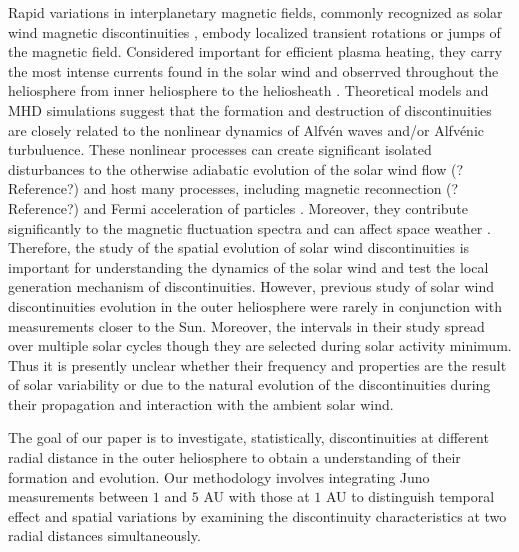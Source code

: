 \documentclass[
]{agujournal2019}
\begin{document}
Rapid variations in interplanetary magnetic fields, commonly recognized as solar wind magnetic discontinuities \citep{colburnDiscontinuitiesSolarWind1966}, embody localized transient rotations or jumps of the magnetic field. Considered important for efficient plasma heating, they carry the most intense currents found in the solar wind and obserrved throughout the heliosphere from inner heliosphere \citep{liuCategorizingMHDDiscontinuities2022} to the heliosheath \citep{burlagaCurrentSheetsHeliosheath2011}. Theoretical models \citep{lerchePropagationMagneticDisturbances1975, medvedevDissipativeDynamicsCollisionless1997} and MHD simulations \citep{grecoIntermittentMHDStructures2008, grecoStatisticalAnalysisDiscontinuities2009, yangFormationRotationalDiscontinuities2015} suggest that the formation and destruction of discontinuities are closely related to the nonlinear dynamics of Alfvén waves and/or Alfvénic turbuluence. These nonlinear processes can create significant isolated disturbances to the otherwise adiabatic evolution of the solar wind flow (?Reference?) and host many processes, including magnetic reconnection (?Reference?) and Fermi acceleration of particles \citep{wentzelMotionMagneticDiscontinuities1964}. Moreover, they contribute significantly to the magnetic fluctuation spectra \citep{borovskyContributionStrongDiscontinuities2010} and can affect space weather \citep{tsurutaniReviewInterplanetaryDiscontinuities2011}. Therefore, the study of the spatial evolution of solar wind discontinuities is important for understanding the dynamics of the solar wind and test the local generation mechanism of discontinuities. However, previous study of solar wind discontinuities evolution \citep{sodingRadialLatitudinalDependencies2001} in the outer heliosphere were rarely in conjunction with measurements closer to the Sun. Moreover, the intervals in their study spread over multiple solar cycles though they are selected during solar activity minimum. Thus it is presently unclear whether their frequency and properties are the result of solar variability or due to the natural evolution of the discontinuities during their propagation and interaction with the ambient solar wind.

The goal of our paper is to investigate, statistically, discontinuities at different radial distance in the outer heliosphere to obtain a understanding of their formation and evolution. Our methodology involves integrating Juno measurements \citep{connerneyJunoMagneticField2017} between \(1\) and \(5\) AU with those at \(1\) AU to distinguish temporal effect and spatial variations by examining the discontinuity characteristics at two radial distances simultaneously.
\end{document}
